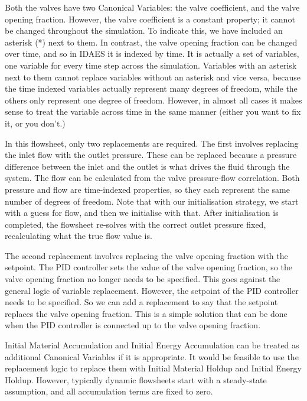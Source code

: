 Both the valves have two Canonical Variables: the valve coefficient, and the
valve opening fraction. However, the valve coefficient is a constant
property; it cannot be changed throughout the simulation. To indicate
this, we have included an asterisk (*) next to them. In contrast, the
valve opening fraction can be changed over time, and so in IDAES it is
indexed by time. It is actually a set of variables, one variable for
every time step across the simulation. Variables with an asterisk next
to them cannot replace variables without an asterisk and vice versa,
because the time indexed variables actually represent many degrees of
freedom, while the others only represent one degree of freedom. However,
in almost all cases it makes sense to treat the variable across time in
the same manner (either you want to fix it, or you don't.)

In this flowsheet, only two replacements are required. The first
involves replacing the inlet flow with the outlet pressure. These can be
replaced because a pressure difference between the inlet and the outlet
is what drives the fluid through the system. The flow can be calculated
from the valve pressure-flow correlation. Both pressure and flow are
time-indexed properties, so they each represent the same number of
degrees of freedom. Note that with our initialisation strategy, we start
with a guess for flow, and then we initialise with that. After
initialisation is completed, the flowsheet re-solves with the correct
outlet pressure fixed, recalculating what the true flow value is.

The second replacement involves replacing the valve opening fraction
with the setpoint. The PID controller sets the value of the valve
opening fraction, so the valve opening fraction no longer needs to be
specified. This goes against the general logic of variable replacement.
However, the setpoint of the PID controller needs to be specified. So we
can add a replacement to say that the setpoint replaces the valve
opening fraction. This is a simple solution that can be done when the
PID controller is connected up to the valve opening fraction.

Initial Material Accumulation and Initial Energy Accumulation can be
treated as additional Canonical Variables if it is appropriate. It would be
feasible to use the replacement logic to replace them with Initial
Material Holdup and Initial Energy Holdup. However, typically dynamic
flowsheets start with a steady-state assumption, and all accumulation
terms are fixed to zero.

